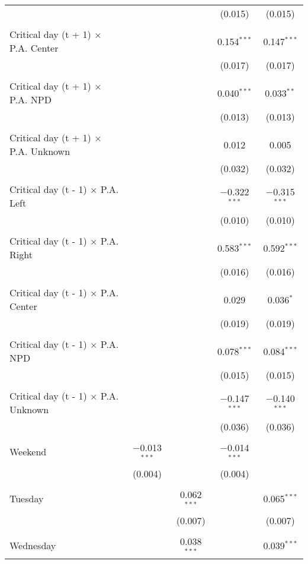 \documentclass[
]{article}
\begin{document}
\begin{table}[!htbp]
{\begin{tabular}{@{\extracolsep{5pt}}lcccc}
  &  &  & (0.015) & (0.015) \\ 
  & & & & \\ 
 Critical day (t + 1) $\times$ P.A. Center &  &  & 0.154$^{***}$ & 0.147$^{***}$ \\ 
  &  &  & (0.017) & (0.017) \\ 
  & & & & \\ 
 Critical day (t + 1) $\times$ P.A. NPD &  &  & 0.040$^{***}$ & 0.033$^{**}$ \\ 
  &  &  & (0.013) & (0.013) \\ 
  & & & & \\ 
 Critical day (t + 1) $\times$ P.A. Unknown &  &  & 0.012 & 0.005 \\ 
  &  &  & (0.032) & (0.032) \\ 
  & & & & \\ 
 Critical day (t - 1) $\times$ P.A. Left &  &  & $-$0.322$^{***}$ & $-$0.315$^{***}$ \\ 
  &  &  & (0.010) & (0.010) \\ 
  & & & & \\ 
 Critical day (t - 1) $\times$ P.A. Right &  &  & 0.583$^{***}$ & 0.592$^{***}$ \\ 
  &  &  & (0.016) & (0.016) \\ 
  & & & & \\ 
 Critical day (t - 1) $\times$ P.A. Center &  &  & 0.029 & 0.036$^{*}$ \\ 
  &  &  & (0.019) & (0.019) \\ 
  & & & & \\ 
 Critical day (t - 1) $\times$ P.A. NPD &  &  & 0.078$^{***}$ & 0.084$^{***}$ \\ 
  &  &  & (0.015) & (0.015) \\ 
  & & & & \\ 
 Critical day (t - 1) $\times$ P.A. Unknown &  &  & $-$0.147$^{***}$ & $-$0.140$^{***}$ \\ 
  &  &  & (0.036) & (0.036) \\ 
  & & & & \\ 
 Weekend & $-$0.013$^{***}$ &  & $-$0.014$^{***}$ &  \\ 
  & (0.004) &  & (0.004) &  \\ 
  & & & & \\ 
 Tuesday &  & 0.062$^{***}$ &  & 0.065$^{***}$ \\ 
  &  & (0.007) &  & (0.007) \\ 
  & & & & \\ 
 Wednesday &  & 0.038$^{***}$ &  & 0.039$^{***}$ \\ 

\end{tabular}}
\end{table}
\end{document}
